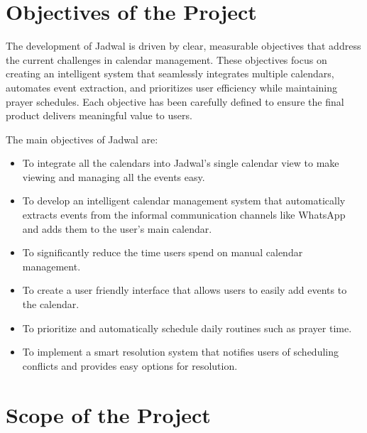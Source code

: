 \section{Objectives of the Project}

The development of Jadwal is driven by clear, measurable objectives that address the current challenges in calendar management. These objectives focus on creating an intelligent system that seamlessly integrates multiple calendars, automates event extraction, and prioritizes user efficiency while maintaining prayer schedules. Each objective has been carefully defined to ensure the final product delivers meaningful value to users.

The main objectives of Jadwal are:
\begin{itemize}
    \item To integrate all the calendars into Jadwal's single calendar view to make viewing and managing all the events easy.
    \item To develop an intelligent calendar management system that automatically extracts events from the informal communication channels like WhatsApp and adds them to the user's main calendar.
    \item To significantly reduce the time users spend on manual calendar management.
    \item To create a user friendly interface that allows users to easily add events to the calendar.
    \item To prioritize and automatically schedule daily routines such as prayer time.
    \item To implement a smart resolution system that notifies users of scheduling conflicts and provides easy options for resolution.
\end{itemize}

\section{Scope of the Project}


